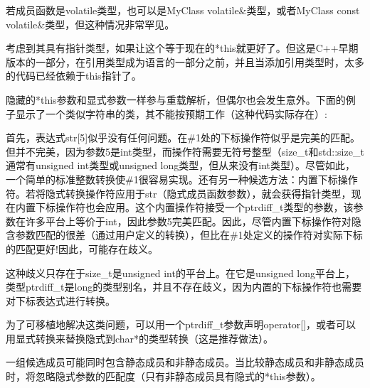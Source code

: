 \begin{notice}
若成员函数是volatile类型，也可以是MyClass volatile\&类型，或者MyClass const volatile\&类型，但这种情况非常罕见。
\end{notice}

考虑到其具有指针类型，如果让这个等于现在的*this就更好了。但这是C++早期版本的一部分，在引用类型成为语言的一部分之前，并且当添加引用类型时，太多的代码已经依赖于this指针了。

隐藏的*this参数和显式参数一样参与重载解析，但偶尔也会发生意外。下面的例子显示了一个类似字符串的类，其不能按预期工作（这种代码实际存在）:


首先，表达式str[5]似乎没有任何问题。在\#1处的下标操作符似乎是完美的匹配。但并不完美，因为参数5是int类型，而操作符需要无符号整型（size\_t和std::size\_t通常有unsigned int类型或unsigned long类型，但从来没有int类型）。尽管如此，一个简单的标准整数转换使\#1很容易实现。还有另一种候选方法：内置下标操作符。若将隐式转换操作符应用于str（隐式成员函数参数），就会获得指针类型，现在内置下标操作符也会应用。这个内置操作符接受一个ptrdiff\_t类型的参数，该参数在许多平台上等价于int，因此参数5完美匹配。因此，尽管内置下标操作符对隐含参数匹配的很差（通过用户定义的转换），但比在\#1处定义的操作符对实际下标的匹配更好!因此，可能存在歧义。

\begin{notice}
这种歧义只存在于size\_t是unsigned int的平台上。在它是unsigned long平台上，类型ptrdiff\_t是long的类型别名，并且不存在歧义，因为内置的下标操作符也需要对下标表达式进行转换。
\end{notice}

为了可移植地解决这类问题，可以用一个ptrdiff\_t参数声明operator[]，或者可以用显式转换来替换隐式到char*的类型转换（这是推荐做法）。

一组候选成员可能同时包含静态成员和非静态成员。当比较静态成员和非静态成员时，将忽略隐式参数的匹配度（只有非静态成员具有隐式的*this参数）。

